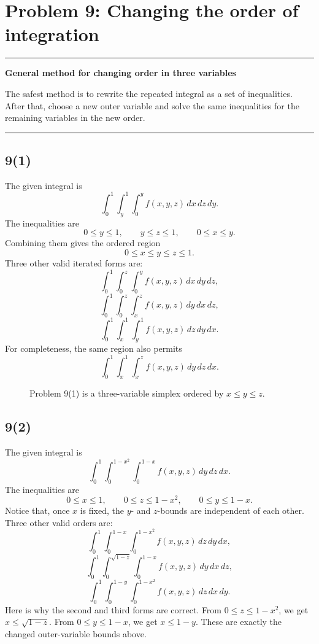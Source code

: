 \documentclass[11pt,a4paper]{article}
\newenvironment{methodbox}[1]{\par\medskip\noindent\begin{minipage}{\linewidth}\hrule\smallskip\textbf{#1}\par\smallskip}{\smallskip\hrule\end{minipage}\par\medskip}
\begin{document}
\section{Problem 9: Changing the order of integration}

\begin{methodbox}{General method for changing order in three variables}
The safest method is to rewrite the repeated integral as a set of inequalities. After that, choose a new outer variable and solve the same inequalities for the remaining variables in the new order.
\end{methodbox}

\subsection*{9(1)}
The given integral is
\[
\int_0^1\int_y^1\int_0^y f(x,y,z)\,dx\,dz\,dy.
\]
The inequalities are
\[
0\le y\le1,
\qquad y\le z\le1,
\qquad 0\le x\le y.
\]
Combining them gives the ordered region
\[
0\le x\le y\le z\le1.
\]
Three other valid iterated forms are:
\[
\int_0^1\int_0^z\int_0^y f(x,y,z)\,dx\,dy\,dz,
\]
\[
\int_0^1\int_0^z\int_x^z f(x,y,z)\,dy\,dx\,dz,
\]
\[
\int_0^1\int_x^1\int_y^1 f(x,y,z)\,dz\,dy\,dx.
\]
For completeness, the same region also permits
\[
\int_0^1\int_x^1\int_x^z f(x,y,z)\,dy\,dz\,dx.
\]

\begin{figure}[H]
\centering
{}
\caption{Problem 9(1) is a three-variable simplex ordered by \(x\le y\le z\).}
\end{figure}

\subsection*{9(2)}
The given integral is
\[
\int_0^1\int_0^{1-x^2}\int_0^{1-x} f(x,y,z)\,dy\,dz\,dx.
\]
The inequalities are
\[
0\le x\le1,
\qquad 0\le z\le1-x^2,
\qquad 0\le y\le1-x.
\]
Notice that, once \(x\) is fixed, the \(y\)- and \(z\)-bounds are independent of each other. Three other valid orders are:
\[
\int_0^1\int_0^{1-x}\int_0^{1-x^2} f(x,y,z)\,dz\,dy\,dx,
\]
\[
\int_0^1\int_0^{\sqrt{1-z}}\int_0^{1-x} f(x,y,z)\,dy\,dx\,dz,
\]
\[
\int_0^1\int_0^{1-y}\int_0^{1-x^2} f(x,y,z)\,dz\,dx\,dy.
\]
Here is why the second and third forms are correct. From \(0\le z\le1-x^2\), we get \(x\le\sqrt{1-z}\). From \(0\le y\le1-x\), we get \(x\le1-y\). These are exactly the changed outer-variable bounds above.
\end{document}
